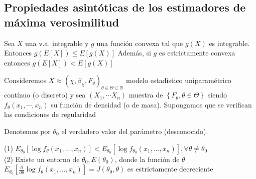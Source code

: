 \subsection{Propiedades asintóticas de los estimadores de máxima verosimilitud}

\begin{proposición} 
Sea $X$ una v.a. integrable y $g$ una función convexa tal que $g(X)$ es integrable. Entonces $g(E[X]) \leq E[g(X)]$ Además, si $g$ es estrictamente convexa entonces $g(E[X])<E[g(X)]$
\end{proposición}

Consideremos $X \approx\left(\chi, \beta_{\chi}, F_{\theta}\right)_{\theta \in
  \Theta \subset \mathbb{R}}$ modelo estadístico uniparamétrico contínuo (o
discreto) y sea $\left(X_{1}, \cdots X_{n}\right)$ muestra de
$\left\{F_{\theta}, \theta \in \Theta\right\}$ siendo $f_{\theta}\left(x_{1},
  \cdots, x_{n}\right)$ su función de densidad (o de masa). Supongamos que se
verifican las condiciones de regularidad

Denotemos por $\theta_{0}$ el verdadero valor del parámetro (desconocido).

\begin{lema}
  (1) $E_{\theta_{0}}\left[\log f_{\theta}\left(x_{1}, \ldots, x_{n}\right)\right]<E_{\theta_{0}}\left[\log f_{\theta_{0}}\left(x_{1}, \ldots, x_{n}\right)\right], \forall \theta \neq \theta_{0}$\\
  (2) Existe un entorno de $\theta_{0}, E\left(\theta_{0}\right)$, donde la función de $\theta$ $E_{\theta_{0}}\left[\frac{\partial}{\partial \theta} \log f_{\theta}\left(x_{1}, \ldots, x_{n}\right)\right]=J\left(\theta_{0}, \theta\right)$ es estrictamente decreciente
\end{lema}

